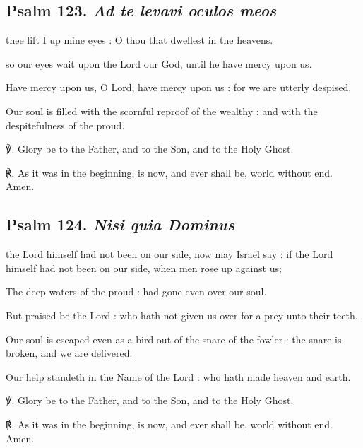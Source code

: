 \begin{multicols}{2}
\subsection{Psalm 123. \textit{Ad te levavi oculos meos}}
 thee lift I up mine eyes : O thou that dwellest in the heavens.\par
{}
\noindent
so our eyes wait upon the Lord our God, until he have mercy upon us.\par
{}Have mercy upon us, O Lord, have mercy upon us : for we are utterly despised.\par
{}Our soul is filled with the scornful reproof of the wealthy : and with the despitefulness of the proud.\par
℣. Glory be to the Father, and to the Son, and to the Holy Ghost.\par
℟. As it was in the beginning, is now, and ever shall be, world without end. Amen.

\subsection{Psalm 124. \textit{Nisi quia Dominus}}
 the Lord himself had not been on our side, now may Israel say : if the Lord himself had not been on our side, when men rose up against us;\par
{}
The deep waters of the proud : had gone even over our soul.\par
{}But praised be the Lord : who hath not given us over for a prey unto their teeth.\par
{}Our soul is escaped even as a bird out of the snare of the fowler : the snare is broken, and we are delivered.\par
{}Our help standeth in the Name of the Lord : who hath made heaven and earth.\par
℣. Glory be to the Father, and to the Son, and to the Holy Ghost.\par
℟. As it was in the beginning, is now, and ever shall be, world without end. Amen.


\end{multicols}
